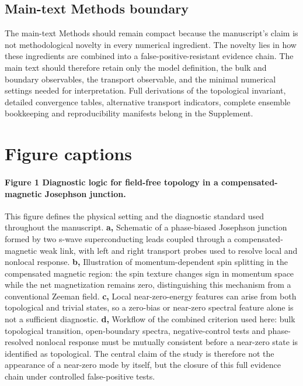 \documentclass[11pt]{article}
\begin{document}

\subsection{Main-text Methods boundary}

The main-text Methods should remain compact because the manuscript's claim is not methodological novelty in every numerical ingredient. The novelty lies in how these ingredients are combined into a false-positive-resistant evidence chain. The main text should therefore retain only the model definition, the bulk and boundary observables, the transport observable, and the minimal numerical settings needed for interpretation. Full derivations of the topological invariant, detailed convergence tables, alternative transport indicators, complete ensemble bookkeeping and reproducibility manifests belong in the Supplement.

\section*{Figure captions}

\paragraph{Figure 1 \textbar{} Diagnostic logic for field-free topology in a compensated-magnetic Josephson junction.}
This figure defines the physical setting and the diagnostic standard used throughout the manuscript. \textbf{a,} Schematic of a phase-biased Josephson junction formed by two s-wave superconducting leads coupled through a compensated-magnetic weak link, with left and right transport probes used to resolve local and nonlocal response. \textbf{b,} Illustration of momentum-dependent spin splitting in the compensated magnetic region: the spin texture changes sign in momentum space while the net magnetization remains zero, distinguishing this mechanism from a conventional Zeeman field. \textbf{c,} Local near-zero-energy features can arise from both topological and trivial states, so a zero-bias or near-zero spectral feature alone is not a sufficient diagnostic. \textbf{d,} Workflow of the combined criterion used here: bulk topological transition, open-boundary spectra, negative-control tests and phase-resolved nonlocal response must be mutually consistent before a near-zero state is identified as topological. The central claim of the study is therefore not the appearance of a near-zero mode by itself, but the closure of this full evidence chain under controlled false-positive tests.
\end{document}
